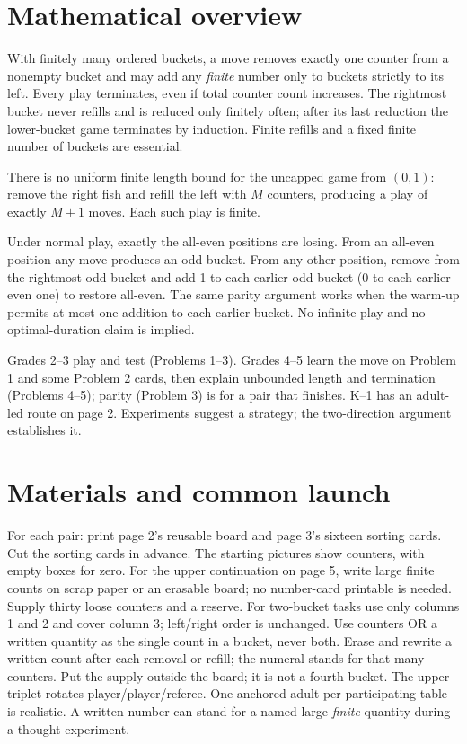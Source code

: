 \documentclass[11pt,letterpaper]{article}
\begin{document}
\section*{Mathematical overview}
With finitely many ordered buckets, a move removes exactly one counter from a nonempty bucket and may add any \emph{finite} number only to buckets strictly to its left. Every play terminates, even if total counter count increases. The rightmost bucket never refills and is reduced only finitely often; after its last reduction the lower-bucket game terminates by induction. Finite refills and a fixed finite number of buckets are essential.

There is no uniform finite length bound for the uncapped game from $(0,1)$: remove the right fish and refill the left with $M$ counters, producing a play of exactly $M+1$ moves. Each such play is finite.

Under normal play, exactly the all-even positions are losing. From an all-even position any move produces an odd bucket. From any other position, remove from the rightmost odd bucket and add 1 to each earlier odd bucket (0 to each earlier even one) to restore all-even. The same parity argument works when the warm-up permits at most one addition to each earlier bucket. No infinite play and no optimal-duration claim is implied.

Grades 2--3 play and test (Problems 1--3). Grades 4--5 learn the move on Problem 1 and some Problem 2 cards, then explain unbounded length and termination (Problems 4--5); parity (Problem 3) is for a pair that finishes. K--1 has an adult-led route on page 2. Experiments suggest a strategy; the two-direction argument establishes it.
\newpage
\section*{Materials and common launch}
For each pair: print page 2's reusable board and page 3's sixteen sorting cards. Cut the sorting cards in advance. The starting pictures show counters, with empty boxes for zero. For the upper continuation on page 5, write large finite counts on scrap paper or an erasable board; no number-card printable is needed. Supply thirty loose counters and a reserve. For two-bucket tasks use only columns 1 and 2 and cover column 3; left/right order is unchanged. Use counters OR a written quantity as the single count in a bucket, never both. Erase and rewrite a written count after each removal or refill; the numeral stands for that many counters. Put the supply outside the board; it is not a fourth bucket. The upper triplet rotates player/player/referee. One anchored adult per participating table is realistic. A written number can stand for a named large \emph{finite} quantity during a thought experiment.
\end{document}
